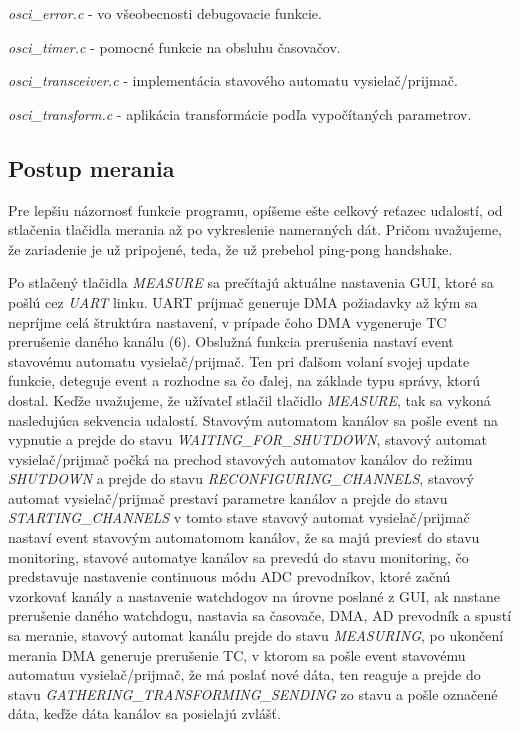 \documentclass[main.tex]{subfiles}
\begin{document}
\begin{multicols*}{2}
			\textit{ osci\_error.c} - vo všeobecnosti debugovacie funkcie.
			
			\textit{ osci\_timer.c} - pomocné funkcie na obsluhu časovačov. 
			
			\textit{ osci\_transceiver.c} - implementácia stavového automatu vysielač/prijmač.
			
			\textit{ osci\_transform.c} - aplikácia transformácie podľa vypočítaných parametrov.
			
			\subsection{Postup merania}
			Pre lepšiu názornosť funkcie programu, opíšeme ešte celkový reťazec udalostí, od stlačenia tlačidla merania až po vykreslenie nameraných dát. Pričom uvažujeme, že zariadenie je už pripojené, teda, že už prebehol ping-pong handshake.
			
			Po stlačený tlačidla \textit{MEASURE} sa prečítajú aktuálne nastavenia GUI, ktoré sa pošlú cez \textit{UART} linku. UART príjmač generuje DMA požiadavky až kým sa nepríjme celá štruktúra nastavení, v prípade čoho DMA vygeneruje TC prerušenie daného kanálu (6).  Obslužná funkcia prerušenia nastaví event stavovému automatu vysielač/prijmač. Ten pri ďalšom volaní svojej update funkcie, deteguje event a rozhodne sa čo ďalej, na základe typu správy, ktorú dostal. Keďže uvažujeme, že užívateľ stlačil tlačidlo \textit{MEASURE}, tak sa vykoná nasledujúca sekvencia udalostí. Stavovým automatom kanálov sa pošle event na vypnutie a prejde do stavu \textit{WAITING\_FOR\_SHUTDOWN}, stavový automat vysielač/prijmač počká na prechod stavových automatov kanálov do režimu \textit{SHUTDOWN} a prejde do stavu \textit{RECONFIGURING\_CHANNELS}, stavový automat vysielač/prijmač prestaví parametre kanálov a prejde do stavu \textit{STARTING\_CHANNELS} v tomto stave stavový automat vysielač/prijmač nastaví event stavovým automatomom kanálov, že sa majú previesť do stavu monitoring, stavové automatye kanálov sa prevedú do stavu monitoring, čo predstavuje nastavenie continuous módu ADC prevodníkov, ktoré začnú vzorkovať kanály a nastavenie watchdogov na úrovne poslané z GUI, ak nastane prerušenie daného watchdogu, nastavia sa časovače, DMA, AD prevodník a spustí sa meranie, stavový automat kanálu prejde do stavu \textit{MEASURING}, po ukončení merania DMA generuje prerušenie TC, v ktorom sa pošle event stavovému automatuu vysielač/prijmač, že má poslať nové dáta, ten reaguje a prejde do stavu \textit{GATHERING\_TRANSFORMING\_SENDING} zo stavu  a pošle označené dáta, keďže dáta kanálov sa posielajú zvlášť.
			

\end{multicols*}
\end{document}
